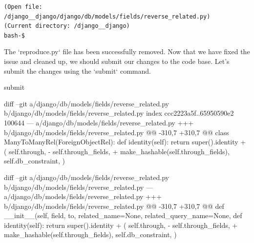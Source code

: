 {\begin{observationbox}
\begin{Verbatim}[breaklines=true, breakanywhere=true]
(Open file: /django__django/django/db/models/fields/reverse_related.py)
(Current directory: /django__django)
bash-$
\end{Verbatim}
\end{observationbox}
\begin{agentbox}
The `reproduce.py` file has been successfully removed. Now that we have fixed the issue and cleaned up, we should submit our changes to the code base. Let's submit the changes using the `submit` command.



\hrulefill
\begin{CodeVerbatim}[breaklines=true, breakanywhere=true]
submit
\end{CodeVerbatim}
\end{agentbox}
\begin{observationbox}\begin{CodeVerbatim}[breaklines=true, breakanywhere=true]

diff --git a/django/db/models/fields/reverse_related.py b/django/db/models/fields/reverse_related.py
index ccc2223a5f..65950590e2 100644
--- a/django/db/models/fields/reverse_related.py
+++ b/django/db/models/fields/reverse_related.py
@@ -310,7 +310,7 @@ class ManyToManyRel(ForeignObjectRel):
     def identity(self):
         return super().identity + (
             self.through,
-            self.through_fields,
+            make_hashable(self.through_fields),
             self.db_constraint,
         )
\end{CodeVerbatim}
\end{observationbox}
\begin{goldpatchbox}
\begin{CodeVerbatim}[breaklines=true, breakanywhere=true]
diff --git a/django/db/models/fields/reverse_related.py b/django/db/models/fields/reverse_related.py
--- a/django/db/models/fields/reverse_related.py
+++ b/django/db/models/fields/reverse_related.py
@@ -310,7 +310,7 @@ def __init__(self, field, to, related_name=None, related_query_name=None,
     def identity(self):
         return super().identity + (
             self.through,
-            self.through_fields,
+            make_hashable(self.through_fields),
             self.db_constraint,
         )
\end{CodeVerbatim}
\end{goldpatchbox}
}